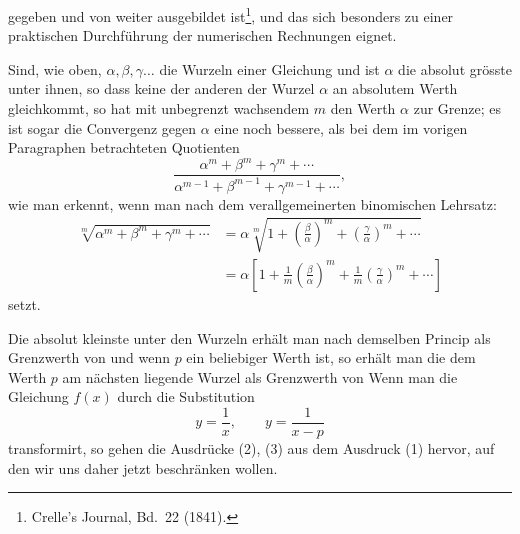 gegeben und von  weiter ausgebildet ist\footnote{Crelle's Journal, Bd.~22 (1841).}, und das sich besonders zu einer praktischen Durchführung der numerischen Rechnungen eignet.

Sind, wie oben, $\alpha, \beta, \gamma \ldots$ die Wurzeln einer Gleichung und ist $\alpha$ die absolut grösste unter ihnen, so dass keine der anderen der Wurzel $\alpha$ an absolutem Werth gleichkommt, so hat
mit unbegrenzt wachsendem $m$ den Werth $\alpha$ zur Grenze; es ist sogar die Convergenz gegen $\alpha$ eine noch bessere, als bei dem im vorigen Paragraphen betrachteten Quotienten
\[
\frac{\alpha^m + \beta^m + \gamma^m + \cdots}{\alpha^{m-1} + \beta^{m-1} + \gamma^{m-1} + \cdots},
\]
wie man erkennt, wenn man nach dem verallgemeinerten binomischen Lehrsatz:
\[
\begin{aligned}
\sqrt[m]{\alpha^m + \beta^m + \gamma^m + \cdots} &= \alpha\sqrt[m]{1 + \left(\frac{\beta}{\alpha}\right)^m + \left(\frac{\gamma}{\alpha}\right)^m + \cdots} \\
&= \alpha\left[1 + \frac{1}{m}\left(\frac{\beta}{\alpha}\right)^m + \frac{1}{m}\left(\frac{\gamma}{\alpha}\right)^m + \cdots\right]
\end{aligned}
\]
setzt.

Die absolut kleinste unter den Wurzeln erhält man nach demselben Princip als Grenzwerth von
und wenn $p$ ein beliebiger Werth ist, so erhält man die dem Werth $p$ am nächsten liegende Wurzel als Grenzwerth von
Wenn man die Gleichung $f(x)$ durch die Substitution
\[
y = \frac{1}{x}, \qquad y = \frac{1}{x - p}
\]
transformirt, so gehen die Ausdrücke (2), (3) aus dem Ausdruck (1) hervor, auf den wir uns daher jetzt beschränken wollen.
